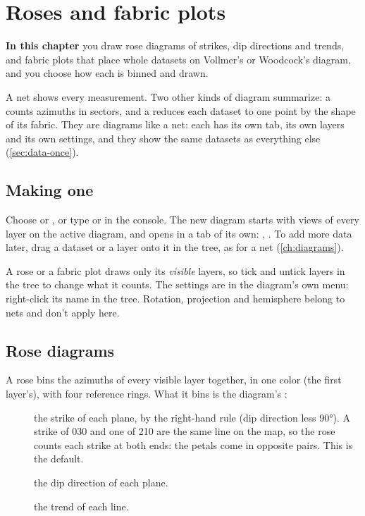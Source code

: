 \chapter{Roses and fabric plots}\label{ch:roses}
\begin{goals}
\textbf{In this chapter} you draw rose diagrams of strikes, dip directions and trends, and fabric plots
that place whole datasets on Vollmer's or Woodcock's diagram, and you choose how each is binned and drawn.
\end{goals}

A net shows every measurement. Two other kinds of diagram summarize: a  counts azimuths
in sectors, and a  reduces each dataset to one point by the shape of its fabric. They are
diagrams like a net: each has its own tab, its own layers and its own settings, and they show the same
datasets as everything else (\cref{sec:data-once}).

\section{Making one}

Choose  or , or type  or
 in the console. The new diagram starts with views of every layer on the active diagram,
and opens in a tab of its own: , . To add more data later, drag a dataset or a
layer onto it in the tree, as for a net (\cref{ch:diagrams}).

A rose or a fabric plot draws only its \emph{visible} layers, so tick and untick layers in the tree to
change what it counts. The settings are in the diagram's own menu: right-click its name in the tree.
Rotation, projection and hemisphere belong to nets and don't apply here.

\section{Rose diagrams}\label{sec:rose}

A rose bins the azimuths of every visible layer together, in one color (the first layer's), with four
reference rings. What it bins is the diagram's :

\begin{description}
\item[] the strike of each plane, by the right-hand rule (dip direction less
90°). A strike of 030 and one of 210 are the same line on the map, so the rose counts each strike at both
ends: the petals come in opposite pairs. This is the default.
\item[] the dip direction of each plane.
\item[] the trend of each line.
\end{description}

